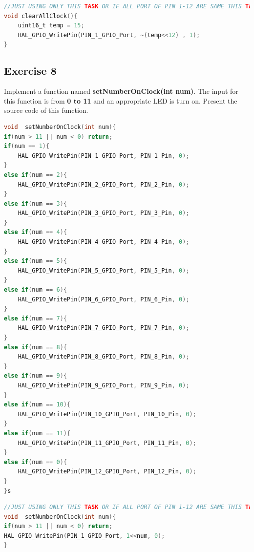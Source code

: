 \documentclass[twoside, final]{hcmut_report}
\begin{document}
\begin{lstlisting}[language=C, caption=Source code for the clearAllClock() function]
//JUST USING ONLY THIS TASK OR IF ALL PORT OF PIN 1-12 ARE SAME THIS TASK.
void clearAllClock(){
	uint16_t temp = 15;
	HAL_GPIO_WritePin(PIN_1_GPIO_Port, ~(temp<<12) , 1);
}
\end{lstlisting}

\subsection{Exercise 8}
Implement a function named \textbf{setNumberOnClock(int num)}. The input for this function is from \textbf{0 to 11} and an appropriate LED is turn on. Present the source code of this function.
\begin{lstlisting}[language=C, caption=Source code for the setNumberOnClock(int num) function]
void  setNumberOnClock(int num){
if(num > 11 || num < 0) return;
if(num == 1){
	HAL_GPIO_WritePin(PIN_1_GPIO_Port, PIN_1_Pin, 0);
}
else if(num == 2){
	HAL_GPIO_WritePin(PIN_2_GPIO_Port, PIN_2_Pin, 0);
}
else if(num == 3){
	HAL_GPIO_WritePin(PIN_3_GPIO_Port, PIN_3_Pin, 0);
}
else if(num == 4){
	HAL_GPIO_WritePin(PIN_4_GPIO_Port, PIN_4_Pin, 0);
}
else if(num == 5){
	HAL_GPIO_WritePin(PIN_5_GPIO_Port, PIN_5_Pin, 0);
}
else if(num == 6){
	HAL_GPIO_WritePin(PIN_6_GPIO_Port, PIN_6_Pin, 0);
}
else if(num == 7){
	HAL_GPIO_WritePin(PIN_7_GPIO_Port, PIN_7_Pin, 0);
}
else if(num == 8){
	HAL_GPIO_WritePin(PIN_8_GPIO_Port, PIN_8_Pin, 0);
}
else if(num == 9){
	HAL_GPIO_WritePin(PIN_9_GPIO_Port, PIN_9_Pin, 0);
}
else if(num == 10){
	HAL_GPIO_WritePin(PIN_10_GPIO_Port, PIN_10_Pin, 0);
}
else if(num == 11){
	HAL_GPIO_WritePin(PIN_11_GPIO_Port, PIN_11_Pin, 0);
}
else if(num == 0){
	HAL_GPIO_WritePin(PIN_12_GPIO_Port, PIN_12_Pin, 0);
}
}s
\end{lstlisting}

\begin{lstlisting}[language=C, caption=Source code for the setNumberOnClock(int num) function]
//JUST USING ONLY THIS TASK OR IF ALL PORT OF PIN 1-12 ARE SAME THIS TASK.
void  setNumberOnClock(int num){
if(num > 11 || num < 0) return;
HAL_GPIO_WritePin(PIN_1_GPIO_Port, 1<<num, 0);
}
\end{lstlisting}
\end{document}
